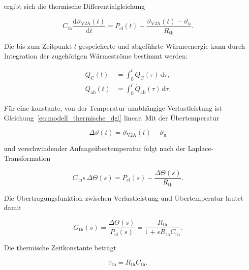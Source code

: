 ergibt sich die thermische Differentialgleichung

\begin{equation}
    C_{\mathrm{th}}
    \frac{\mathrm{d}\vartheta_{\mathrm{V2A}}(t)}{\mathrm{d}t}
    =
    P_{\mathrm{el}}(t)
    -
    \frac{
        \vartheta_{\mathrm{V2A}}(t)-\vartheta_{\mathrm{u}}
    }{R_{\mathrm{th}}}.
    \label{eq:modell_thermische_dgl}
\end{equation}

Die bis zum Zeitpunkt \(t\) gespeicherte und abgeführte Wärmeenergie kann
durch Integration der zugehörigen Wärmeströme bestimmt werden:

\begin{align}
    Q_{\mathrm{C}}(t)
    &=\int_{0}^{t}\dot Q_{\mathrm{C}}(\tau)\,\mathrm{d}\tau,
    \label{eq:modell_waermeenergie_speicher}\\
    Q_{\mathrm{ab}}(t)
    &=\int_{0}^{t}\dot Q_{\mathrm{ab}}(\tau)\,\mathrm{d}\tau.
    \label{eq:modell_waermeenergie_abgabe}
\end{align}

Für eine konstante, von der Temperatur unabhängige Verlustleistung ist
Gleichung~\eqref{eq:modell_thermische_dgl} linear. Mit der Übertemperatur

\begin{equation}
    \Delta\vartheta(t)
    =\vartheta_{\mathrm{V2A}}(t)-\vartheta_{\mathrm{u}}
    \label{eq:modell_uebertemperatur}
\end{equation}

und verschwindender Anfangsübertemperatur folgt nach der
Laplace-Transformation

\begin{equation}
    C_{\mathrm{th}}s\,\Delta\Theta(s)
    =
    P_{\mathrm{el}}(s)
    -\frac{\Delta\Theta(s)}{R_{\mathrm{th}}}.
    \label{eq:modell_laplace_waermebilanz}
\end{equation}

Die Übertragungsfunktion zwischen Verlustleistung und Übertemperatur lautet
damit

\begin{equation}
    G_{\mathrm{th}}(s)
    =
    \frac{\Delta\Theta(s)}{P_{\mathrm{el}}(s)}
    =
    \frac{R_{\mathrm{th}}}
         {1+sR_{\mathrm{th}}C_{\mathrm{th}}}.
    \label{eq:modell_uebertragungsfunktion_pt1}
\end{equation}

Die thermische Zeitkonstante beträgt

\begin{equation}
    \tau_{\mathrm{th}}
    =R_{\mathrm{th}}C_{\mathrm{th}}.
    \label{eq:modell_zeitkonstante}
\end{equation}


